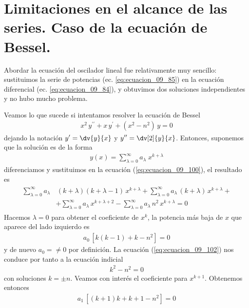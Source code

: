 \section*{Limitaciones en el alcance de las series. Caso de la ecuación de Bessel.}
Abordar la ecuación del oscilador lineal fue relativamente muy sencillo: sustituimos la serie de potencias (ec. \ref{eq:ecuacion_09_85}) en la ecuación diferencial (ec. \ref{eq:ecuacion_09_84}), y obtuvimos dos soluciones independientes y no hubo mucho problema.
\par
Veamos lo que sucede si intentamos resolver la ecuación de Bessel
\begin{align}
x^{2} \, y^{\prime \prime} + x \, y^{\prime} + (x^{2} - n^{2}) \, y = 0
\label{eq:ecuacion_09_100}
\end{align}
dejando la notación $\displaystyle y^{\prime} = \dv{y}{x}$ y $\displaystyle y^{\prime \prime} = \dv[2]{y}{x}$. Entonces, suponemos que la solución es de la forma
\begin{align*}
y(x) = \sum_{\lambda=0}^{\infty} a_{\lambda} \; x^{k + \lambda}
\end{align*}
diferenciamos y sustituimos en la ecuación (\ref{eq:ecuacion_09_100}), el resultado es
\begin{align}
\begin{aligned}
\sum_{\lambda=0}^{\infty} a_{\lambda} & \, (k + \lambda)(k + \lambda - 1) \, x^{k + \lambda} + \sum_{\lambda=0}^{\infty} a_{\lambda} \, (k + \lambda) \, x^{k + \lambda} + \\[0.5em]
& + \sum_{\lambda=0}^{\infty} a_{\lambda} \, x^{k + \lambda + 2} - \sum_{\lambda=0}^{\infty} a_{\lambda} \, n^{2} \, x^{k + \lambda}  = 0
\end{aligned}
\label{eq:ecuacion_09_101}
\end{align}
Hacemos $\lambda = 0$ para obtener el coeficiente de $x^{k}$, la potencia más baja de $x$ que aparece del lado izquierdo es
\begin{align}
a_{0} \, [ k (k - 1) + k - n^{2} ] = 0
\label{eq:ecuacion_09_102}
\end{align}
y de nuevo $a_{0} = \neq 0$ por definición. La ecuación (\ref{eq:ecuacion_09_102}) nos conduce por tanto a la ecuación indicial
\begin{align}
k^{2} - n^{2} = 0
\label{eq:ecuacion_09_103}
\end{align}
con soluciones $k = \pm n$.
Veamos con interés el coeficiente para $x^{k+1}$. Obtenemos entonces
\begin{align*}
a_{1} \, [(k + 1) k + k + 1 - n^{2} ] = 0
\end{align*}
